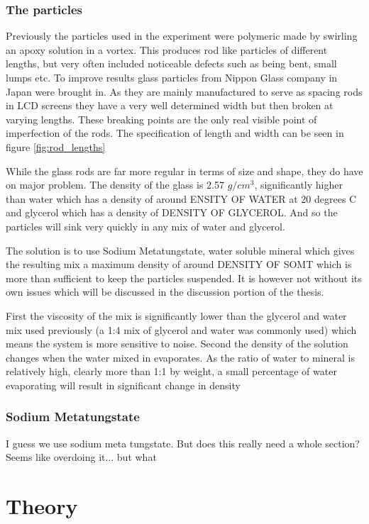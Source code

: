 \documentclass[]{report}
\begin{document}
\subsection{The particles}
	Previously the particles used in the experiment were polymeric made by swirling an apoxy solution in a vortex. This produces rod like particles of different lengths, but very often included noticeable defects such as being bent, small lumps etc. 
	To improve results glass particles from Nippon Glass company in Japan were brought in. As they are mainly manufactured to serve as spacing rods in LCD screens they have a very well determined width but then broken at varying lengths. These breaking points are the only real visible point of imperfection of the rods.
	The specification of length and width can be seen in figure \ref{fig:rod_lengths}
	
	While the glass rods are far more regular in terms of size and shape, they do have on major problem. The density of the glass is 2.57 $g/cm^3$, significantly higher than water which has a density of around ENSITY OF WATER at 20 degrees C and glycerol which has a density of DENSITY OF GLYCEROL. And so the particles will sink very quickly in any mix of water and glycerol.
	
	The solution is to use Sodium Metatungstate, water soluble mineral which gives the resulting mix a maximum density of around DENSITY OF SOMT which is more than sufficient to keep the particles suspended. It is however not without its own issues which will be discussed in the discussion portion of the thesis. 
	
	
	First the viscosity of the mix is significantly lower than the glycerol and water mix used previously (a 1:4 mix of glycerol and water was commonly used) which means the system is more sensitive to noise. 
	Second the density of the solution changes when the water mixed in evaporates. As the ratio of water to mineral is relatively high, clearly more than 1:1 by weight, a small percentage of water evaporating will result in significant change in density
	
	
	
	
\subsection{Sodium Metatungstate}
I guess we use sodium meta tungstate. But does this really need a whole section? Seems like overdoing it... but what %

\chapter{Theory}
\end{document}
